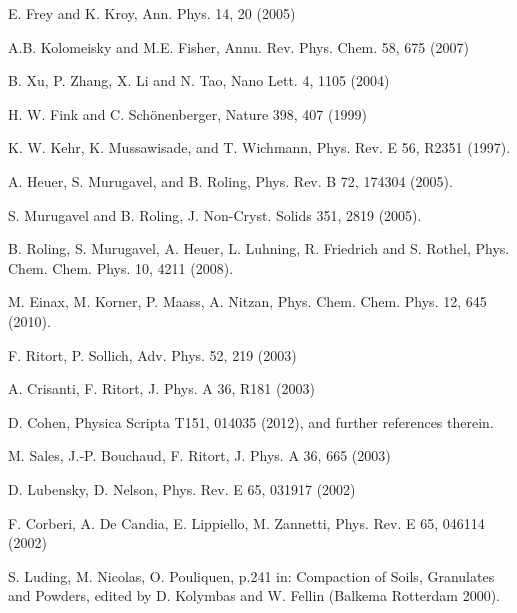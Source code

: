 \documentclass[aps,pre,floats,floatfix,twocolumn]{revtex4}
\begin{document}
\begin{thebibliography}{99}
E. Frey and K. Kroy, Ann. Phys. 14, 20 (2005)

A.B. Kolomeisky and M.E. Fisher, Annu. Rev. Phys. Chem. 58, 675 (2007)

B. Xu, P. Zhang, X. Li and N. Tao, Nano Lett. 4, 1105 (2004)

H. W. Fink and C. Sch\"onenberger, Nature 398, 407 (1999)


K. W. Kehr, K. Mussawisade, and T. Wichmann,
Phys. Rev. E 56, R2351 (1997).

A. Heuer, S. Murugavel, and B. Roling,
Phys. Rev. B 72, 174304 (2005).

S. Murugavel and B. Roling, 
J. Non-Cryst. Solids 351, 2819 (2005).

B. Roling, S. Murugavel, A. Heuer, L. Luhning, R. Friedrich and S. Rothel, 
Phys. Chem. Chem. Phys. 10, 4211 (2008).

M. Einax, M. Korner, P. Maass, A. Nitzan,
Phys. Chem. Chem. Phys. 12, 645 (2010).




F. Ritort, P. Sollich, 
Adv. Phys. 52, 219 (2003)

A. Crisanti, F. Ritort,  
J. Phys. A 36, R181 (2003) 


D. Cohen, 
Physica Scripta T151, 014035 (2012), 
and further references therein. 

M. Sales, J.-P. Bouchaud, F. Ritort, 
J. Phys. A 36, 665 (2003) 

D. Lubensky, D. Nelson, 
Phys. Rev. E 65, 031917 (2002)

F. Corberi, A. De Candia, E. Lippiello, M. Zannetti, 
Phys. Rev. E 65, 046114 (2002)

S. Luding, M. Nicolas, O. Pouliquen, 
p.241 in: Compaction of Soils, Granulates and Powders, 
edited by D. Kolymbas and W. Fellin (Balkema Rotterdam 2000).



\end{thebibliography}
\end{document}
